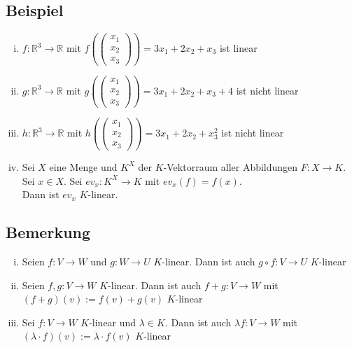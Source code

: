 \subsection{Beispiel} %
\label{sub:beispiel}
\begin{enumerate}[(i)]
	\item $f: \mathds{R}^3 \to \mathds{R}$ mit $f\left( \left(\begin{smallmatrix}x_1 \\ x_2 \\ x_3 \end{smallmatrix}
	\right) \right) = 3x_1 + 2x_2 + x_3$ ist linear
	\item $g: \mathds{R}^3 \to \mathds{R}$ mit $g\left( \left(\begin{smallmatrix}x_1 \\ x_2 \\ x_3 \end{smallmatrix}
	\right) \right) = 3x_1 + 2x_2 + x_3 + 4 $ ist nicht linear
	\item $h: \mathds{R}^3 \to \mathds{R}$ mit $h\left( \left(\begin{smallmatrix}x_1 \\ x_2 \\ x_3 \end{smallmatrix}
	\right) \right) = 3x_1 + 2x_2 + x_3^2$ ist nicht linear
	\item Sei $X$ eine Menge und $K^X$ der $K$-Vektorraum aller Abbildungen $F: X \to K$. Sei $x \in X$. Sei 
	$ev_x : K^X \to K $ mit $ev_x (f)= f(x)$. \\
	Dann ist $ev_x$ $K$-linear.
\end{enumerate}

\subsection{Bemerkung} %
\label{sub:bemerkung}
\begin{enumerate}[(i)]
	\item Seien $f: V \to W$ und $g: W \to U$ $K$-linear. Dann ist auch $g \circ f : V \to U$ $K$-linear
	\item Seien $f,g : V \to W$ $K$-linear. Dann ist auch $f+g: V \to W$ mit $(f+g)(v):=f(v)+g(v)$ $K$-linear
	\item Sei $f: V \to W$ \(K\)-linear und $\lambda \in K$. Dann ist auch $\lambda f : V \to W$ mit 
	$(\lambda \cdot f)(v):= \lambda \cdot  f(v)$ \(K\)-linear 
\end{enumerate}

